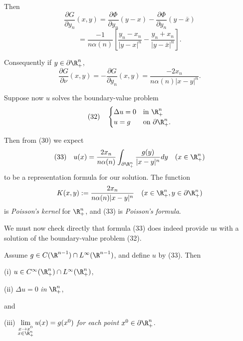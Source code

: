 Then
$$\frac{\partial G}{\partial y_n}(x, y) = \frac{\partial \Phi}{\partial y_n}(y - x) - \frac{\partial \Phi}{\partial y_n}(y - \bar{x})$$
$$= \frac{-1}{n\alpha(n)} \left[ \frac{y_n - x_n}{|y - x|^n} - \frac{y_n + x_n}{|y - \bar{x}|^n} \right].$$

Consequently if $y \in \partial \R^n_+$,
$$\frac{\partial G}{\partial \nu}(x, y) = -\frac{\partial G}{\partial y_n}(x, y) = \frac{-2x_n}{n\alpha(n)|x - y|^n}.$$

Suppose now $u$ solves the boundary-value problem
$$(32) \quad \begin{cases}
\Delta u = 0 & \text{in } \R^n_+ \\
u = g & \text{on } \partial \R^n_+.
\end{cases}$$

Then from (30) we expect
$$(33) \quad u(x) = \frac{2x_n}{n\alpha(n)} \int_{\partial \R^n_+} \frac{g(y)}{|x - y|^n} dy \quad (x \in \R^n_+)$$
to be a representation formula for our solution. The function
$$K(x, y) := \frac{2x_n}{n\alpha(n)|x - y|^n} \quad (x \in \R^n_+, y \in \partial \R^n_+)$$
is \textit{Poisson's kernel} for $\R^n_+$, and (33) is \textit{Poisson's formula}.

We must now check directly that formula (33) does indeed provide us with a solution of the boundary-value problem (32).

\begin{theorem}
\label{thm:poissons-formula-half-space}
Assume $g \in C(\R^{n-1}) \cap L^{\infty}(\R^{n-1})$, and define $u$ by (33). Then

(i) $u \in C^{\infty}(\R^n_+) \cap L^{\infty}(\R^n_+)$,

(ii) $\Delta u = 0$ \textit{in} $\R^n_+$,

and

(iii) $\lim\limits_{\substack{x \to x^0 \\ x \in \R^n_+}} u(x) = g(x^0)$ \textit{for each point} $x^0 \in \partial \R^n_+$.
\end{theorem}

